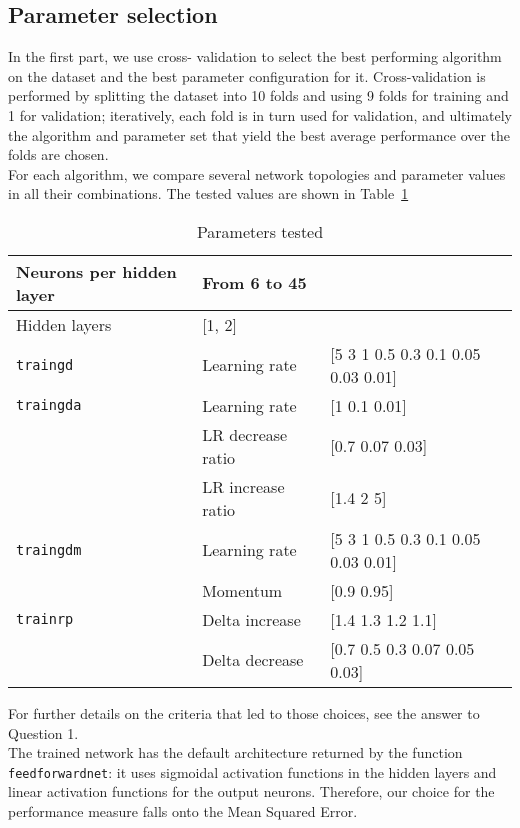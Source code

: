 \documentclass{article}
\begin{document}
\subsection{Parameter selection}
In the first part, we use cross- validation to select the best performing algorithm on the dataset and the best parameter configuration for it. Cross-validation is performed by splitting the dataset into 10 folds and using 9 folds for training and 1 for validation; iteratively, each fold is in turn used for validation, and ultimately the algorithm and parameter set that yield the best average performance over the folds are chosen.\\
For each algorithm, we compare several network topologies and parameter values in all their combinations. The tested values are shown in Table~\ref{tab:parameters}\\
\begin{table}
	\centering
	\caption{Parameters tested}
	\label{tab:parameters}

		\begin{tabular}{|l|l|l|}
		\hline
		Neurons per hidden layer & \multicolumn{2}{l|}{From 6 to 45} \\\hline
		Hidden layers		& \multicolumn{2}{l|}{[1, 2]} \\\hline
		\verb$traingd$	&	Learning rate		&	[5 3 1 0.5 0.3 0.1 0.05 0.03 0.01] \\\hline
		\verb$traingda$	&	Learning rate & [1 0.1 0.01] \\\cline{2-3}
										& LR decrease ratio	&	[0.7 0.07 0.03] \\\cline{2-3}
										& LR increase ratio & [1.4 2 5]	\\\hline
		\verb$traingdm$	&	Learning rate	&	[5 3 1 0.5 0.3 0.1 0.05 0.03 0.01]	\\\cline{2-3}
										&	Momentum			&	[0.9 0.95]	\\\hline
		\verb$trainrp$	&	Delta increase	&	[1.4 1.3 1.2 1.1]	\\\cline{2-3}
										&	Delta decrease	&	[0.7 0.5 0.3 0.07 0.05 0.03]	\\
		\hline		
		\end{tabular}
\end{table}
For further details on the criteria that led to those choices, see the answer to Question 1.\\
The trained network has the default architecture returned by the function \verb$feedforwardnet$: it uses sigmoidal activation functions in the hidden layers and linear activation functions for the output neurons. Therefore, our choice for the performance measure falls onto the Mean Squared Error.\\
\end{document}

